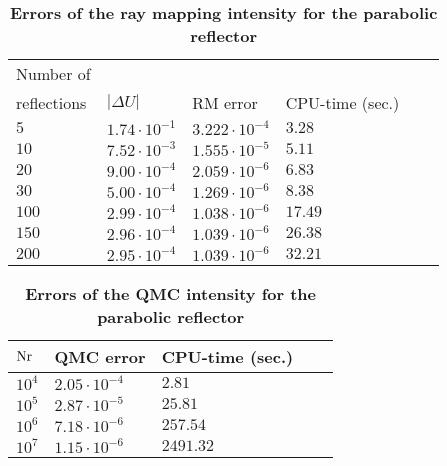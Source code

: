 \begin{table}[t] 
\centering
\caption{\bf Errors of the ray mapping intensity for the parabolic reflector}
\begin{tabular}{llllll}
 \hline  Number of\\
 reflections\;  & $|\Delta U|$ & RM error  & CPU-time (sec.)\\
  \hline 
 $5$      & $1.74\cdot 10^{-1}$  & $3.222\cdot10^{-4}$& $3.28$  \\
$10$      & $7.52\cdot 10^{-3}$ & $1.555\cdot 10^{-5}$& $5.11$   \\
$20$      & $9.00 \cdot 10^{-4}$ & $2.059\cdot 10^{-6}$& $6.83$  \\
 $30$    & $5.00 \cdot 10^{-4}$ & $1.269\cdot 10^{-6}$ & $8.38$  \\
$100$    & $2.99 \cdot 10^{-4}$ & $1.038\cdot 10^{-6}$ & $17.49$  \\
$150$    & $2.96 \cdot 10^{-4}$ & $1.039\cdot 10^{-6}$ & $26.38$  \\
$200$    & $2.95 \cdot 10^{-4}$ & $1.039\cdot 10^{-6}$ & $32.21$  \\
 \hline
 \end{tabular}
 \label{tab:ray_mapping_pr}
 \end{table}
\begin{table}[t] 
\centering
\caption{\bf Errors of the QMC intensity for the parabolic reflector}
\begin{tabular}{lllll}
 \hline  $\textrm{Nr}$\;  & QMC error & CPU-time (sec.)\\
  \hline 
$10^4$     & $2.05\cdot 10^{-4}$   & $2.81$  \\
$10^5$     & $2.87\cdot 10^{-5}$   & $25.81$   \\
$10^6$     & $7.18 \cdot 10^{-6}$  & $257.54$  \\
$10^7$     & $1.15 \cdot 10^{-6}$  & $2491.32$  \\
 \hline
 \end{tabular}
 \label{tab:qmc_raymapping_pr}
 \end{table}
